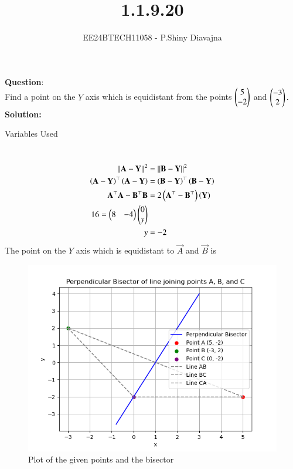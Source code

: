 \documentclass[journal]{IEEEtran}
\begin{document}

\vspace{3cm}

\title{1.1.9.20}
\author{EE24BTECH11058 - P.Shiny Diavajna}
{\let\newpage\relax\maketitle}

\renewcommand{\thefigure}{\theenumi}
\renewcommand{\thetable}{\theenumi}
\setlength{\intextsep}{10pt} %


\renewcommand{\thetable}{\theenumi}


\textbf{Question}:\\
Find a point on the $Y$ axis which is equidistant from the points  $\begin{pmatrix}5\\-2\end{pmatrix}$ and $\begin{pmatrix}-3\\2\end{pmatrix}.$
\\
\textbf{Solution: }
\begin{table}[h!]    
  \centering
  
  \caption{Variables Used}
  \label{tab10.5.3.9.1}
\end{table}\\
\begin{align}
\left\lVert\mathbf{A}-\mathbf{Y}\right\rVert^2&=\left\lVert\mathbf{B}-\mathbf{Y}\right\rVert^2\\
	\left(\mathbf{A}-\mathbf{Y}\right)^\top\left(\mathbf{A}-\mathbf{Y}\right)&=\left(\mathbf{B}-\mathbf{Y}\right)^\top\left(\mathbf{B}-\mathbf{Y}\right)\\
	\mathbf{{A}^\top}\mathbf{A}-\mathbf{B^\top}\mathbf{B}&=2\left(\mathbf{A}^\top-\mathbf{B}^\top\right)\left(\mathbf{Y}\right)\\
16=\begin{pmatrix}8&-4\end{pmatrix}\begin{pmatrix}0\\y\end{pmatrix}\\
y&=-2
\end{align}
The point on the $Y$ axis which is equidistant to $\vec{A}$ and $\vec{B}$ is 
\begin{figure}[h!]
   \centering
   \includegraphics[width=0.7\linewidth]{figs/fig.png}
   \caption{Plot of the given points and the bisector}
\end{figure}  
\end{document}
